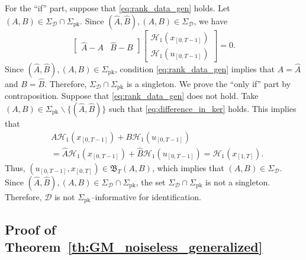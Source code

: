 \documentclass[journal,twoside,web]{ieeecolor}
\begin{document}
For the ``if'' part, suppose that \eqref{eq:rank_data_gen} holds. Let \mbox{$(A,B)\in\Sigma_\mathcal{D}\cap\Sigma_\text{pk}$}. Since \mbox{$(\hat{A},\hat{B}),(A,B)\in\Sigma_\mathcal{D}$}, we have
\begin{equation}
\label{eq:difference_in_ker}
\begin{bmatrix}
\hat{A}-A & \hat{B}-B
\end{bmatrix}\begin{bmatrix}
\mathcal{H}_1(x_{[0,T-1]}) \\
\mathcal{H}_1(u_{[0,T-1]})
\end{bmatrix}=0.
\end{equation}
Since $(\hat{A},\hat{B}),(A,B)\in\Sigma_\text{pk}$, condition \eqref{eq:rank_data_gen} implies that $A=\hat{A}$ and $B=\hat{B}$. Therefore, $\Sigma_\mathcal{D}\cap\Sigma_\text{pk}$ is a singleton. We prove the ``only if'' part by contraposition. Suppose that \eqref{eq:rank_data_gen} does not hold. Take $(A,B)\in\Sigma_\text{pk}\backslash\{(\hat{A},\hat{B})\}$ such that \eqref{eq:difference_in_ker} holds. This implies that
\begin{equation}
\begin{split}
&A\mathcal{H}_1(x_{[0,T-1]})+B\mathcal{H}_1(u_{[0,T-1]}) \\
&=\hat{A}\mathcal{H}_1(x_{[0,T-1]})+\hat{B}\mathcal{H}_1(u_{[0,T-1]})=\mathcal{H}_1(x_{[1,T]}).
\end{split}
\end{equation}
Thus, $(u_{[0,T-1]},x_{[0,T]})\in\mathfrak{B}_T(A,B)$, which implies that $(A,B)\in\Sigma_\mathcal{D}$. Since  $(\hat{A},\hat{B}),(A,B)\in\Sigma_\mathcal{D}\cap\Sigma_\text{pk}$, the set \linebreak $\Sigma_\mathcal{D}\cap\Sigma_\text{pk}$ is not a singleton. Therefore, $\mathcal{D}$ is not \mbox{$\Sigma_\text{pk}$--informative} for identification. \hfill \QED


\subsection{Proof of Theorem~\ref{th:GM_noiseless_generalized}}
\end{document}
